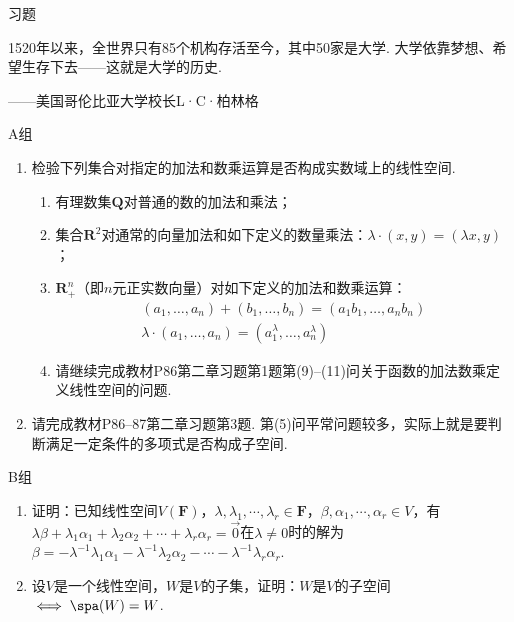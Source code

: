 \vspace{2ex}
\centerline{\heiti \Large 习题}

\vspace{2ex}
{\kaishu 1520年以来，全世界只有85个机构存活至今，其中50家是大学. 大学依靠梦想、希望生存下去——这就是大学的历史.}
\begin{flushright}
    \kaishu
    ——美国哥伦比亚大学校长L·C·柏林格
\end{flushright}

\centerline{\heiti A组}
\begin{enumerate}
    \item 检验下列集合对指定的加法和数乘运算是否构成实数域上的线性空间.
          \begin{enumerate}
              \item 有理数集$\mathbf{Q}$对普通的数的加法和乘法；

              \item 集合$\mathbf{R}^2$对通常的向量加法和如下定义的数量乘法：$\lambda\cdot(x,y)=(\lambda x,y)$；

              \item $\mathbf{R}_+^n$（即$n$元正实数向量）对如下定义的加法和数乘运算：
                    \begin{gather*}
                        (a_1,\ldots,a_n)+(b_1,\ldots,b_n)=(a_1b_1,\ldots,a_nb_n) \\
                        \lambda\cdot(a_1,\ldots,a_n)=(a_1^\lambda,\ldots,a_n^\lambda)
                    \end{gather*}

              \item 请继续完成教材P86第二章习题第1题第(9)--(11)问关于函数的加法数乘定义线性空间的问题.
          \end{enumerate}

    \item 请完成教材P86--87第二章习题第3题. 第(5)问平常问题较多，实际上就是要判断满足一定条件的多项式是否构成子空间.
\end{enumerate}

\centerline{\heiti B组}
\begin{enumerate}
    \item 证明：已知线性空间$V(\mathbf{F})$，$\lambda,\lambda_1,\cdots,\lambda_r\in\mathbf{F}$，$\beta,\alpha_1,\cdots,\alpha_r\in V$，有$\lambda\beta+\lambda_1\alpha_1+\lambda_2\alpha_2+\cdots+\lambda_r\alpha_r=\vec{0}$在$\lambda\neq 0$时的解为$\beta=-\lambda^{-1}\lambda_1\alpha_1-\lambda^{-1}\lambda_2\alpha_2-\cdots-\lambda^{-1}\lambda_r\alpha_r$.
    \item 设$V$是一个线性空间，$W$是$V$的子集，证明：$W$是$V$的子空间$\iff \spa(W)=W$.
\end{enumerate}

